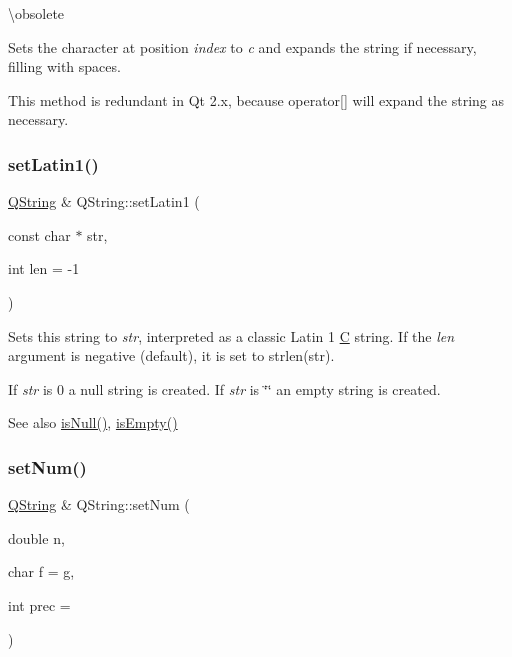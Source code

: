 \textbackslash{}obsolete

Sets the character at position {\itshape index} to {\itshape c} and expands the string if necessary, filling with spaces.

This method is redundant in Qt 2.\+x, because operator\mbox{[}\mbox{]} will expand the string as necessary. \mbox{\label{class_q_string_ab7df9df250d260fd19067f9c921c0047}} 
\subsubsection{\texorpdfstring{setLatin1()}{setLatin1()}}
{\footnotesize\ttfamily \mbox{\hyperlink{class_q_string}{Q\+String}} \& Q\+String\+::set\+Latin1 (\begin{DoxyParamCaption}\item[{const char $\ast$}]{str,  }\item[{int}]{len = {\ttfamily -\/1} }\end{DoxyParamCaption})}

Sets this string to {\itshape str}, interpreted as a classic Latin 1 \mbox{\hyperlink{class_c}{C}} string. If the {\itshape len} argument is negative (default), it is set to strlen(str).

If {\itshape str} is 0 a null string is created. If {\itshape str} is \char`\"{}\char`\"{} an empty string is created.

\begin{DoxySeeAlso}{See also}
\mbox{\hyperlink{class_q_string_a6a6da156364a32ef91e35f83b1955acc}{is\+Null()}}, \mbox{\hyperlink{class_q_string_aa032d4b5892338beb575a85e59bbbf38}{is\+Empty()}} 
\end{DoxySeeAlso}
\mbox{\label{class_q_string_a5b30e9bb5310afb39f770db5fd5bf646}} 
\subsubsection{\texorpdfstring{setNum()}{setNum()}\hspace{0.1cm}{\footnotesize\ttfamily [1/8]}}
{\footnotesize\ttfamily \mbox{\hyperlink{class_q_string}{Q\+String}} \& Q\+String\+::set\+Num (\begin{DoxyParamCaption}\item[{double}]{n,  }\item[{char}]{f = {\ttfamily \textquotesingle{}g\textquotesingle{}},  }\item[{int}]{prec = {} }\end{DoxyParamCaption})}

